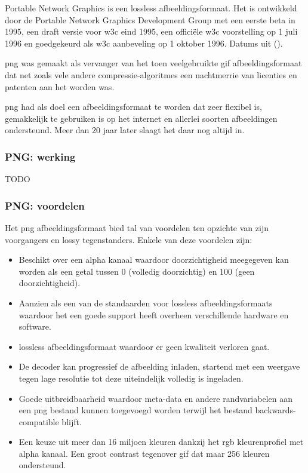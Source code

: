 Portable Network Graphics is een \gls{lossless} \gls{afbeeldingsformaat}. Het is ontwikkeld door de Portable Network Graphics Development Group met een eerste beta in 1995, een draft versie voor \gls{w3c} eind 1995, een officiële \gls{w3c} voorstelling op 1 juli 1996 en goedgekeurd als \gls{w3c} aanbeveling op 1 oktober 1996. Datums uit  (\cite{pnghistory}).

\Gls{png} was gemaakt als vervanger van het toen veelgebruikte \gls{gif} \gls{afbeeldingsformaat} dat net zoals vele andere \glspl{compressie-algoritme} een nachtmerrie van licenties en patenten aan het worden was. 

\Gls{png} had als doel een \gls{afbeeldingsformaat} te worden dat zeer flexibel is, gemakkelijk te gebruiken is op het internet en allerlei soorten afbeeldingen ondersteund. Meer dan 20 jaar later slaagt het daar nog altijd in.

\subsubsection{PNG: werking}
\label{sec:afbeeldingscompressie-png-werking}

TODO


\subsubsection{PNG: voordelen}
\label{sec:afbeeldingscompressie-png-voordelen}

Het \gls{png} \gls{afbeeldingsformaat} bied tal van voordelen ten opzichte van zijn voorgangers en \gls{lossy} tegenstanders. Enkele van deze voordelen zijn:

\begin{itemize}
	\item Beschikt over een alpha kanaal waardoor doorzichtigheid meegegeven kan worden als een getal tussen 0 (volledig doorzichtig) en 100 (geen doorzichtigheid).
	
	\item Aanzien als een van de standaarden voor \gls{lossless} \glspl{afbeeldingsformaat} waardoor het een goede support heeft overheen verschillende hardware en software.
	
	\item \Gls{lossless} \gls{afbeeldingsformaat} waardoor er geen kwaliteit verloren gaat.
	
	\item De  \gls{decoder} kan progressief de afbeelding inladen, startend met een weergave tegen lage resolutie tot deze uiteindelijk volledig is ingeladen.
	
	\item Goede uitbreidbaarheid waardoor \gls{meta-data} en andere randvariabelen aan een \gls{png} bestand kunnen toegevoegd worden terwijl het bestand  \gls{backwards-compatible} blijft.
	
	\item Een keuze uit meer dan 16 miljoen kleuren dankzij het \gls{rgb} kleurenprofiel met alpha kanaal. Een groot contrast tegenover \gls{gif} dat maar 256 kleuren ondersteund. 
\end{itemize}

